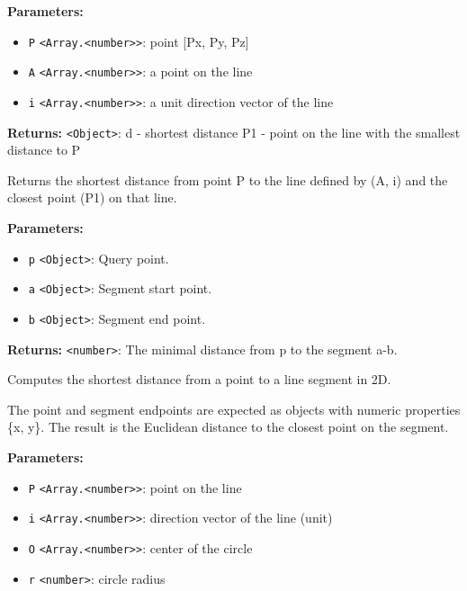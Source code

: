\documentclass[12pt,a4paper]{article}
\begin{document}
\noindent \textbf{Parameters:}
\begin{itemize}
  \item \texttt{P} \texttt{<Array.<number>>}: point [Px, Py, Pz]
  \item \texttt{A} \texttt{<Array.<number>>}: a point on the line
  \item \texttt{i} \texttt{<Array.<number>>}: a unit direction vector of the line
\end{itemize}

\noindent \textbf{Returns:} \texttt{<Object>}: d   - shortest distance
P1  - point on the line with the smallest distance to P

\noindent Returns the shortest distance from point P to the line defined by (A, i)
and the closest point (P1) on that line.

\vspace{5mm}
\noindent {}


\noindent \textbf{Parameters:}
\begin{itemize}
  \item \texttt{p} \texttt{<Object>}: Query point.
  \item \texttt{a} \texttt{<Object>}: Segment start point.
  \item \texttt{b} \texttt{<Object>}: Segment end point.
\end{itemize}

\noindent \textbf{Returns:} \texttt{<number>}: The minimal distance from p to the segment a-b.

\noindent Computes the shortest distance from a point to a line segment in 2D.

The point and segment endpoints are expected as objects with numeric
properties \{x, y\}. The result is the Euclidean distance to the closest
point on the segment.

\vspace{5mm}
\noindent {}


\noindent \textbf{Parameters:}
\begin{itemize}
  \item \texttt{P} \texttt{<Array.<number>>}: point on the line
  \item \texttt{i} \texttt{<Array.<number>>}: direction vector of the line (unit)
  \item \texttt{O} \texttt{<Array.<number>>}: center of the circle
  \item \texttt{r} \texttt{<number>}: circle radius
\end{itemize}
\end{document}

